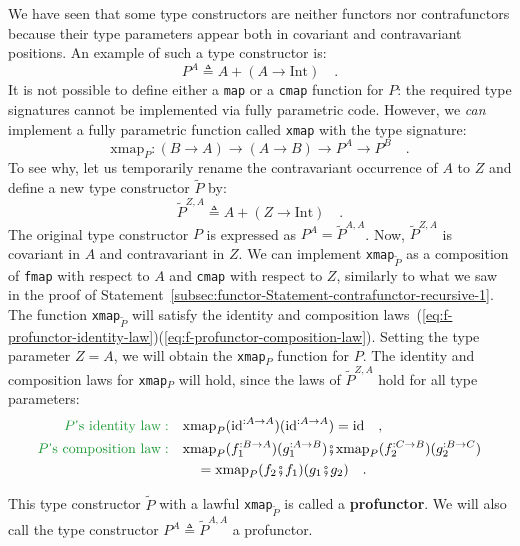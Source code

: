 We have seen that some type constructors are neither functors nor
contrafunctors because their type parameters appear both in covariant
and contravariant positions. An example of such a type constructor
is:
\[
P^{A}\triangleq A+\left(A\rightarrow\text{Int}\right)\quad.
\]
It is not possible to define either a \lstinline!map! or a \lstinline!cmap!
function for $P$: the required type signatures cannot be implemented
via fully parametric code. However, we \emph{can} implement a fully
parametric function called \lstinline!xmap! with the type signature:
\[
\text{xmap}_{P}:\left(B\rightarrow A\right)\rightarrow\left(A\rightarrow B\right)\rightarrow P^{A}\rightarrow P^{B}\quad.
\]
To see why, let us temporarily rename the contravariant occurrence
of $A$ to $Z$ and define a new type constructor $\tilde{P}$ by:
\[
\tilde{P}^{Z,A}\triangleq A+\left(Z\rightarrow\text{Int}\right)\quad.
\]
The original type constructor $P$ is expressed as $P^{A}=\tilde{P}^{A,A}$.
Now, $\tilde{P}^{Z,A}$ is covariant in $A$ and contravariant in
$Z$. We can implement \lstinline!xmap!$_{\tilde{P}}$ as a composition
of \lstinline!fmap! with respect to $A$ and \lstinline!cmap! with
respect to $Z$, similarly to what we saw in the proof of Statement~\ref{subsec:functor-Statement-contrafunctor-recursive-1}.
The function \lstinline!xmap!$_{\tilde{P}}$ will satisfy the identity
and composition laws~(\ref{eq:f-profunctor-identity-law})\textendash (\ref{eq:f-profunctor-composition-law}).
Setting the type parameter $Z=A$, we will obtain the \lstinline!xmap!$_{P}$
function for $P$. The identity and composition laws for \lstinline!xmap!$_{P}$
will hold, since the laws of $\tilde{P}^{Z,A}$ hold for all type
parameters:
\begin{align*}
{\color{greenunder}P\text{\textsf{'}s identity law}:}\quad & \text{xmap}_{P}(\text{id}^{:A\rightarrow A})(\text{id}^{:A\rightarrow A})=\text{id}\quad,\\
{\color{greenunder}P\text{\textsf{'}s composition law}:}\quad & \text{xmap}_{P}(f_{1}^{:B\rightarrow A})(g_{1}^{:A\rightarrow B})\bef\text{xmap}_{P}(f_{2}^{:C\rightarrow B})(g_{2}^{:B\rightarrow C})\\
 & \quad=\text{xmap}_{P}(f_{2}\bef f_{1})(g_{1}\bef g_{2})\quad.
\end{align*}

This type constructor $\tilde{P}$ with a lawful \lstinline!xmap!$_{\tilde{P}}$
is called a \textbf{profunctor}. We will also call
the type constructor $P^{A}\triangleq\tilde{P}^{A,A}$ a profunctor.

